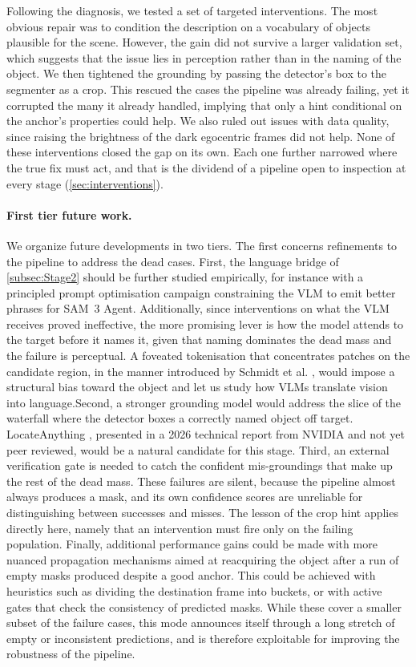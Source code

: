Following the diagnosis, we tested a set of targeted interventions. The most obvious repair was to condition the description on a vocabulary of objects plausible for the scene. However, the gain did not survive a larger validation set, which suggests that the issue lies in perception rather than in the naming of the object. We then tightened the grounding by passing the detector's box to the segmenter as a crop. This rescued the cases the pipeline was already failing, yet it corrupted the many it already handled, implying that only a hint conditional on the anchor's properties could help. We also ruled out issues with data quality, since raising the brightness of the dark egocentric frames did not help. None of these interventions closed the gap on its own. Each one further narrowed where the true fix must act, and that is the dividend of a pipeline open to inspection at every stage (\cref{sec:interventions}).

\paragraph{First tier future work.} We organize future developments in two tiers. The first concerns refinements to the pipeline to address the dead cases. First, the language bridge of \cref{subsec:Stage2} should be further studied empirically, for instance with a principled prompt optimisation campaign constraining the VLM to emit better phrases for SAM~3 Agent. Additionally, since interventions on what the VLM receives proved ineffective, the more promising lever is how the model attends to the target before it names it, given that naming dominates the dead mass and the failure is perceptual. A foveated tokenisation that concentrates patches on the candidate region, in the manner introduced by Schmidt et al. \cite{schmidt2025segmentthingfoveatedtokenization}, would impose a structural bias toward the object and let us study how VLMs translate vision into language.Second, a stronger grounding model would address the slice of the waterfall where the detector boxes a correctly named object off target. LocateAnything \cite{wang2026locateanythingfasthighqualityvisionlanguage}, presented in a 2026 technical report from NVIDIA and not yet peer reviewed, would be a natural candidate for this stage. Third, an external verification gate is needed to catch the confident mis-groundings that make up the rest of the dead mass. These failures are silent, because the pipeline almost always produces a mask, and its own confidence scores are unreliable for distinguishing between successes and misses. The lesson of the crop hint applies directly here, namely that an intervention must fire only on the failing population. Finally, additional performance gains could be made with more nuanced propagation mechanisms aimed at reacquiring the object after a run of empty masks produced despite a good anchor. This could be achieved with heuristics such as dividing the destination frame into buckets, or with active gates that check the consistency of predicted masks. While these cover a smaller subset of the failure cases, this mode announces itself through a long stretch of empty or inconsistent predictions, and is therefore exploitable for improving the robustness of the pipeline.

